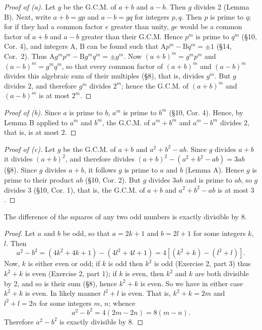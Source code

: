 \documentclass[DIN, pagenumber=false, fontsize=11pt, parskip=half]{scrartcl}
\begin{document}
\begin{problems}[from=1,step=1]
    \begin{proof}[Proof of (a)]
        Let $g$ be the G.C.M. of $a+b$ and $a-b$.
        Then $g$ divides 2 (Lemma B).
        Next, write $a+b = gp$ and $a-b = gq$ for integers $p,q$.
        Then $p$ is prime to $q$; for if they had a common factor $e$ greater than unity, $ge$ would be a common factor of $a+b$ and $a-b$ greater than their G.C.M.
        Hence $p^m$ is prime to $q^m$ (\S 10, Cor. 4), and integers $\mathrm{A}$, $\mathrm{B}$ can be found such that $\mathrm{A}p^m - \mathrm{B}q^m = \pm 1$ (\S 14, Cor.\ 2).
        Thus $\mathrm{A}g^mp^m - \mathrm{B}g^mq^m = \pm g^m$.
        Now $(a+b)^m = g^mp^m$ and $(a-b)^m = g^mq^m$, so that every common factor of $(a+b)^m$ and $(a-b)^m$ divides this algebraic sum of their multiples (\S 8), that is, divides $g^m$.
        But $g$ divides $2$, and therefore $g^m$ divides $2^m$; hence the G.C.M. of $(a+b)^m$ and $(a-b)^m$ is at most $2^m$.
    \end{proof}

    \begin{proof}[Proof of (b)]
        Since $a$ is prime to $b$, $a^m$ is prime to $b^m$ (\S 10, Cor. 4).
        Hence, by Lemma B applied to $a^m$ and $b^m$, the G.C.M. of $a^m + b^m$ and $a^m - b^m$ divides $2$, that is, is at most $2$.
    \end{proof}

    \begin{proof}[Proof of (c)]
        Let $g$ be the G.C.M. of $a+b$ and $a^2 + b^2 - ab$.
        Since $g$ divides $a+b$ it divides $(a+b)^2$, and therefore divides $(a+b)^2 - (a^2 + b^2 - ab) = 3ab$ (\S 8).
        Since $g$ divides $a+b$, it follows $g$ is prime to $a$ and $b$ (Lemma A).
        Hence $g$ is prime to their product $ab$ (\S 10, Cor. 2).
        But $g$ divides $3ab$ and is prime to $ab$, so $g$ divides $3$ (\S 10, Cor. 1), that is, the G.C.M. of $a+b$ and $a^2 + b^2 - ab$ is at most $3$.
    \end{proof}

    \problem The difference of the squares of any two odd numbers is exactly divisible by 8.

    \begin{proof}
        Let $a$ and $b$ be odd, so that $a = 2k+1$ and $b = 2l+1$ for some integers $k$, $l$. 
        Then
        \[
            a^2 - b^2 = (4k^2 + 4k + 1) - (4l^2 + 4l + 1) = 4\left[(k^2 + k) - (l^2 + l)\right].
        \]
        Now, $k$ is either even or odd; if $k$ is odd then $k^2$ is odd (Exercise 2, part 3) thus $k^2 + k$ is even (Exercise 2, part 1); if $k$ is even, then $k^2$ and $k$ are both divisible by 2, and so is their sum (\S 8), hence $k^2+k$ is even. So we have in either case $k^2+k$ is even.
        In likely manner $l^2 + l$ is even.
        That is, $k^2 + k = 2m$ and $l^2 + l = 2n$ for some integers $m$, $n$; whence
        \[
            a^2 - b^2 = 4(2m - 2n) = 8(m-n).
        \]
        Therefore $a^2 - b^2$ is exactly divisible by $8$.
    \end{proof}


\end{problems}
\end{document}
